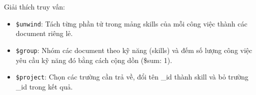 Giải thích truy vấn:
\begin{itemize}
    \item \texttt{\$unwind}: Tách từng phần tử trong mảng skills của mỗi công việc thành các document riêng lẻ.
    \item \texttt{\$group}: Nhóm các document theo kỹ năng (skills) và đếm số lượng công việc yêu cầu kỹ năng đó bằng cách cộng dồn (\$sum: 1).
    \item \texttt{\$project}: Chọn các trường cần trả về, đổi tên \_id thành skill và bỏ trường \_id trong kết quả.
\end{itemize}